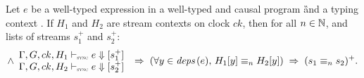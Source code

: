 \begin{lemma}
    \label{lem:semantics:grsync:theorems:determinism:e}
    Let $e$ be a well-typed expression in a well-typed and causal program \G
    and a typing context \tyCtx. If $H_1$ and $H_2$ are stream contexts on clock $ck$, then for
    all $n \in \N$, and lists of streams $s_1^+$ and $s_2^+$:
    \begin{equation*}
        \wedge\begin{array}{l}
            \exprDenot{H_1}{ck}{e}{s_1^+} \\
            \exprDenot{H_2}{ck}{e}{s_2^+}
        \end{array}
        \; \Rightarrow \;
        \left(\forall y \in \deps{e}, \, H_1[y] \equiv_n H_2[y]\right)
        \; \Rightarrow \;
        (s_1 \equiv_n s_2)^+.
    \end{equation*}
\end{lemma}
